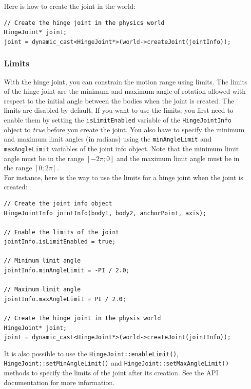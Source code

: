 \documentclass[a4paper,12pt]{article}
\begin{document}
    Here is how to create the joint in the world: \\

    \begin{lstlisting}
// Create the hinge joint in the physics world
HingeJoint* joint;
joint = dynamic_cast<HingeJoint*>(world->createJoint(jointInfo));
  \end{lstlisting}

     \subsubsection{Limits}

     With the hinge joint, you can constrain the motion range using limits. The limits of the hinge joint are the minimum and maximum angle of
     rotation allowed with respect to the initial angle between the bodies when the joint is created. The limits are disabled by default.
     If you want to use the limits, you first need to enable them by setting the \texttt{isLimitEnabled} variable of the \texttt{HingeJointInfo}
     object to \emph{true} before you create the joint. You also have to specify the minimum and maximum limit angles (in radians) using
     the \texttt{minAngleLimit} and \texttt{maxAngleLimit} variables of the joint info object. Note that the minimum limit angle must be in the
     range $[ -2 \pi; 0 ]$ and the maximum limit angle must be in the range $[ 0; 2 \pi ]$. \\

     For instance, here is the way to use the limits for a hinge joint when the joint is created: \\

     \begin{lstlisting}
// Create the joint info object
HingeJointInfo jointInfo(body1, body2, anchorPoint, axis);

// Enable the limits of the joint
jointInfo.isLimitEnabled = true;

// Minimum limit angle
jointInfo.minAngleLimit = -PI / 2.0;

// Maximum limit angle
jointInfo.maxAngleLimit = PI / 2.0;

// Create the hinge joint in the physis world
HingeJoint* joint;
joint = dynamic_cast<HingeJoint*>(world->createJoint(jointInfo));
  \end{lstlisting}

     \vspace{0.6cm}

     \begin{sloppypar}
        It is also possible to use the \texttt{HingeJoint::enableLimit()}, \texttt{HingeJoint::setMinAngleLimit()} and \texttt{HingeJoint::setMaxAngleLimit()} methods to specify
        the limits of the joint after its creation. See the API documentation for more information.
     \end{sloppypar}
\end{document}
